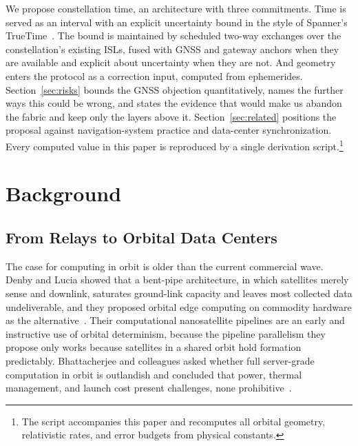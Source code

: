 \documentclass[twocolumn,10pt]{article}
\begin{document}
We propose constellation time, an architecture with three commitments. Time is served as an interval with an explicit uncertainty bound in the style of Spanner's TrueTime~\cite{corbett2012}. The bound is maintained by scheduled two-way exchanges over the constellation's existing ISLs, fused with GNSS and gateway anchors when they are available and explicit about uncertainty when they are not. And geometry enters the protocol as a correction input, computed from ephemerides. Section~\ref{sec:risks} bounds the GNSS objection quantitatively, names the further ways this could be wrong, and states the evidence that would make us abandon the fabric and keep only the layers above it. Section~\ref{sec:related} positions the proposal against navigation-system practice and data-center synchronization. Every computed value in this paper is reproduced by a single derivation script.\footnote{The script accompanies this paper and recomputes all orbital geometry, relativistic rates, and error budgets from physical constants.}

\section{Background}\label{sec:background}
\subsection{From Relays to Orbital Data Centers}\label{sec:relays}
The case for computing in orbit is older than the current commercial wave. Denby and Lucia showed that a bent-pipe architecture, in which satellites merely sense and downlink, saturates ground-link capacity and leaves most collected data undeliverable, and they proposed orbital edge computing on commodity hardware as the alternative~\cite{denby2020}. Their computational nanosatellite pipelines are an early and instructive use of orbital determinism, because the pipeline parallelism they propose only works because satellites in a shared orbit hold formation predictably. Bhattacherjee and colleagues asked whether full server-grade computation in orbit is outlandish and concluded that power, thermal management, and launch cost present challenges, none prohibitive~\cite{bhattacherjee2020}.
\end{document}
